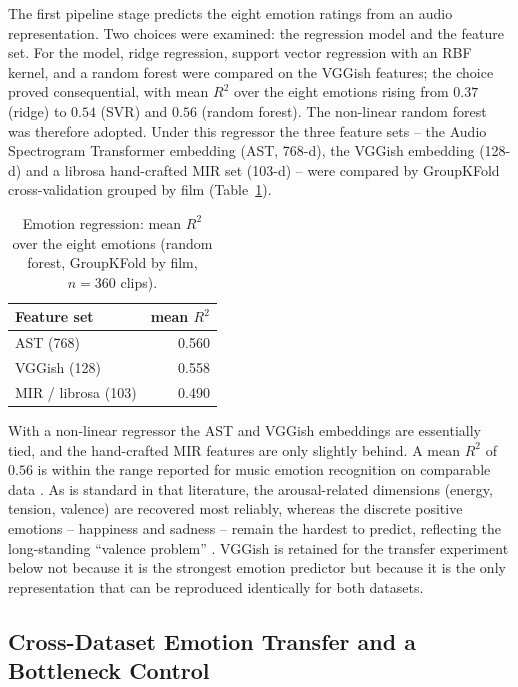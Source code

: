 The first pipeline stage predicts the eight emotion ratings from an audio representation.
Two choices were examined: the regression model and the feature set. For the model, ridge
regression, support vector regression with an RBF kernel, and a random forest were compared
on the VGGish features; the choice proved consequential, with mean $R^2$ over the eight
emotions rising from $0.37$ (ridge) to $0.54$ (SVR) and $0.56$ (random forest). The
non-linear random forest was therefore adopted. Under this regressor the three feature sets
-- the Audio Spectrogram Transformer embedding (AST, 768-d), the VGGish embedding (128-d) and
a librosa hand-crafted MIR set (103-d) -- were compared by GroupKFold cross-validation
grouped by film (Table~\ref{tab:emotion_regression}).

\begin{table}[t]
  \centering
  \caption{Emotion regression: mean $R^2$ over the eight emotions (random forest, GroupKFold
    by film, $n=360$ clips).}
  \label{tab:emotion_regression}
  \begin{tabular}{lr}
    \hline
    Feature set & mean $R^2$ \\
    \hline
    AST (768) & 0.560 \\
    VGGish (128) & 0.558 \\
    MIR / librosa (103) & 0.490 \\
    \hline
  \end{tabular}
\end{table}

With a non-linear regressor the AST and VGGish embeddings are essentially tied, and the
hand-crafted MIR features are only slightly behind. A mean $R^2$ of $0.56$ is within the
range reported for music emotion recognition on comparable data \citep{kang2025there}. As is
standard in that literature, the arousal-related dimensions (energy, tension, valence) are
recovered most reliably, whereas the discrete positive emotions -- happiness and sadness --
remain the hardest to predict, reflecting the long-standing ``valence problem''
\citep{kim2010music,kang2025there}. VGGish is retained for the transfer experiment below not
because it is the strongest emotion predictor but because it is the only representation that
can be reproduced identically for both datasets.

\subsection{Cross-Dataset Emotion Transfer and a Bottleneck Control}
\label{subsec:emotion_transfer}

